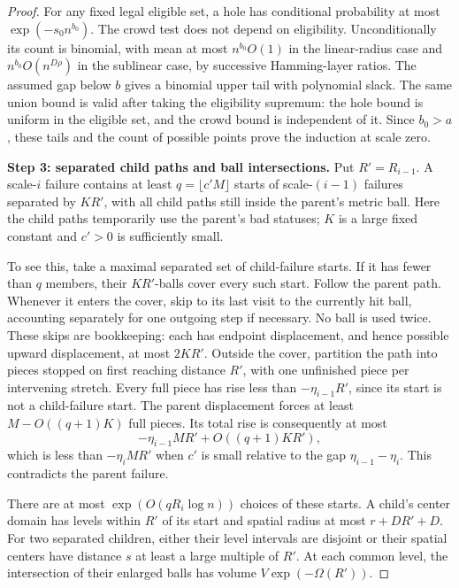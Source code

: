 \begin{proof}
For any fixed legal eligible set, a hole has conditional probability at
most \(\exp(-s_0n^{b_0})\). The crowd test does not depend on eligibility.
Unconditionally its count is binomial, with mean at most
\(n^{b_0}O(1)\) in the linear-radius case and
\(n^{b_0}O(n^{D\rho})\) in the sublinear case, by successive Hamming-layer
ratios. The assumed gap below \(b\) gives a binomial upper tail with
polynomial slack. The same union bound is valid after taking the
eligibility supremum: the hole bound is uniform in the eligible set,
and the crowd bound is independent of it. Since \(b_0>a\), these tails
and the count of possible points prove the induction at scale zero.

\noindent\textbf{Step 3: separated child paths and ball intersections.}\quad
Put \(R'=R_{i-1}\). A scale-\(i\) failure contains at least
\(q=\lfloor c'M\rfloor\) starts of scale-\((i-1)\) failures separated
by \(KR'\), with all child paths still inside the parent's metric ball.
Here the child paths temporarily use the parent's bad statuses; \(K\)
is a large fixed constant and \(c'>0\) is sufficiently small.

To see this, take a maximal separated set of child-failure starts. If it
has fewer than \(q\) members, their \(KR'\)-balls cover every such start.
Follow the parent path. Whenever it enters the cover, skip to its last
visit to the currently hit ball, accounting separately for one outgoing
step if necessary. No ball is used twice. These skips are bookkeeping:
each has endpoint displacement, and hence possible upward displacement,
at most \(2KR'\). Outside the cover, partition the path into pieces
stopped on first reaching distance \(R'\), with one unfinished piece per
intervening stretch. Every full piece has rise less than
\(-\eta_{i-1}R'\), since its start is not a child-failure start. The parent
displacement forces at least \(M-O((q+1)K)\) full pieces. Its total rise
is consequently at most
\[
 -\eta_{i-1}MR'+O((q+1)KR'),
\]
which is less than \(-\eta_iMR'\) when \(c'\) is small relative to the
gap \(\eta_{i-1}-\eta_i\). This contradicts the parent failure.

There are at most \(\exp(O(qR_i\log n))\) choices of these starts.
A child's center domain has levels within \(R'\) of its start and spatial
radius at most \(r+DR'+D\). For two separated children, either their
level intervals are disjoint or their spatial centers have distance
\(s\) at least a large multiple of \(R'\). At each common level, the
intersection of their enlarged balls has volume
\(V\exp(-\Omega(R'))\).


\end{proof}
